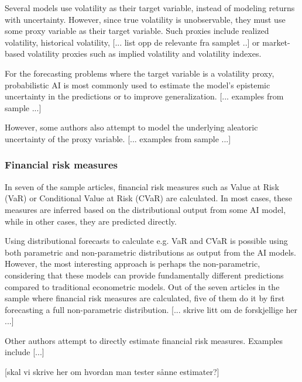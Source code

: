 Several models use volatility as their target variable, instead of modeling returns with uncertainty. However, since true volatility is unobservable, they must use some proxy variable as their target variable. Such proxies include realized volatility, historical volatility, [... list opp de relevante fra samplet ..] or market-based volatility proxies such as implied volatility and volatility indexes.

For the forecasting problems where the target variable is a volatility proxy, probabilistic AI is most commonly used to estimate the model's epistemic uncertainty in the 
predictions or to improve generalization. [... examples from sample ...]

However, some authors also attempt to model the underlying aleatoric uncertainty of the proxy variable. [... examples from sample ...]



\subsubsection{Financial risk measures}
In seven of the sample articles, financial risk measures such as Value at Risk (VaR) or Conditional Value at Risk (CVaR) are calculated. In most cases, these measures are inferred based on the distributional output from some AI model, while in other cases, they are predicted directly.

Using distributional forecasts to calculate e.g. VaR and CVaR is possible using both parametric and non-parametric distributions as output from the AI models. However, the most interesting approach is perhaps the non-parametric, considering that these models can provide fundamentally different predictions compared to traditional econometric models. Out of the seven articles in the sample where financial risk measures are calculated, five of them do it by first forecasting a full non-parametric distribution. [... skrive litt om de forskjellige her ...]

Other authors attempt to directly estimate financial risk measures. Examples include [...]

[skal vi skrive her om hvordan man tester sånne estimater?]



